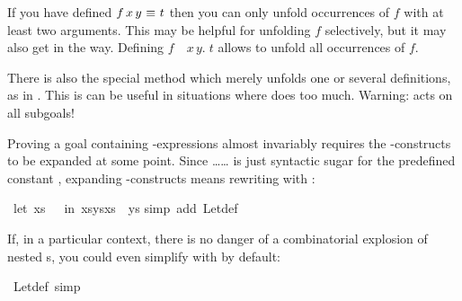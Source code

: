 \begin{isabellebody}
\begin{isamarkuptext}
\begin{warn}
  If you have defined $f\,x\,y~\emph{$\equiv$}~t$ then you can only unfold
  occurrences of $f$ with at least two arguments. This may be helpful for unfolding
  $f$ selectively, but it may also get in the way. Defining
  $f$~\isasymequiv~\isasymlambda$x\,y.\;t$ allows to unfold all occurrences of $f$.
\end{warn}

There is also the special method 
which merely unfolds
one or several definitions, as in .
This is can be useful in situations where  does too much.
Warning:  acts on all subgoals!%
\end{isamarkuptext}%
\isamarkuptrue%
%
\isamarkuptrue%
%
\begin{isamarkuptext}%
%
Proving a goal containing -expressions almost invariably requires the
-con\-structs to be expanded at some point. Since
\ldots\isa{=}\ldots{} is just syntactic sugar for
the predefined constant , expanding -constructs
means rewriting with :%
\end{isamarkuptext}%
\isamarkuptrue%
\isamarkupfalse%
\ {}{}let\ xs\ {}\ {}{}\ in\ xs{}ys{}xs{}\ {}\ ys{}\isanewline
%
\isadelimproof
%
\endisadelimproof
%
\isatagproof
{}\isamarkupfalse%
{}simp\ add{}\ Let{}def{}\isanewline
{}\isamarkupfalse%
%
\endisatagproof
{\isafoldproof}%
%
\isadelimproof
%
\endisadelimproof
%
\begin{isamarkuptext}%
If, in a particular context, there is no danger of a combinatorial explosion
of nested s, you could even simplify with  by
default:%
\end{isamarkuptext}%
\isamarkuptrue%
\isamarkupfalse%
\ Let{}def\ {}simp{}%

\end{isabellebody}
